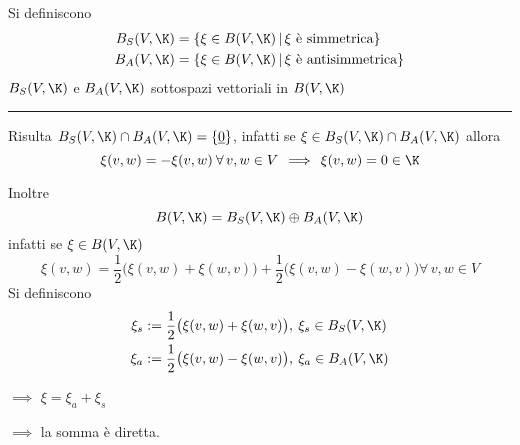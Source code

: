 Si definiscono \begin{align*}
    B_{S}(V, \K) &= \{\xi \in B(V, \K)\,|\, \xi\text{ è simmetrica}\}\\
    B_{A}(V, \K) &= \{\xi \in B(V, \K)\,|\, \xi\text{ è antisimmetrica}\}
\end{align*} $ B_{S}(V, \K) $ e $ B_{A}(V, \K) $ sottospazi vettoriali in $ B(V, \K) $


\rule{7em}{.4pt}

Risulta $ B_{S}(V, \K)\cap B_{A}(V, \K)=\{\underline{0}\}   $, infatti se $ \xi \in B_{S}(V, \K)\cap B_{A}(V, \K) $ allora \[
    \xi (v, w)=-\xi(v,w)\: \forall\, v,w \in V \,\implies\, \xi(v,w)=0 \in \K
\]

Inoltre \begin{equation}B(V, \K)=B_{S}(V, \K)\oplus B_{A}(V, \K) \end{equation} infatti se $ \xi \in B(V, \K) $ \[
    \xi(v,w)=\frac{1}{2}\big(\xi(v,w)+\xi(w,v)\big)+\frac{1}{2}\big(\xi(v,w)-\xi(w,v)\big) \forall\, v, w \in V
\] 
Si definiscono \begin{align*}
    \xi_{s}&:= \frac{1}{2}\big(\xi(v,w)+\xi(w,v)\big),\:\xi_{s} \in B_{S}(V, \K)  \\
    \xi_{a}&:= \frac{1}{2}\big(\xi(v,w)-\xi(w,v)\big),\:\xi_{a}\in B_{A}(V, \K)  
\end{align*} 

$\implies$ $ \xi=\xi_{a}+\xi_{s} $ 

$\implies$ la somma è diretta.


